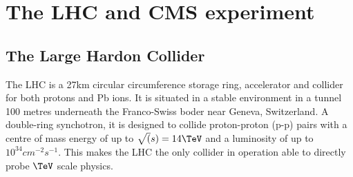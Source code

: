 
\chapter{The LHC and CMS experiment} %
\section{The Large Hardon Collider}
\label{lhc_intro}
The LHC is a 27km circular circumference storage ring, accelerator and collider for 
both protons and Pb ions. It is situated in a stable environment in a tunnel 
100 metres underneath the Franco-Swiss boder near Geneva, Switzerland.
A double-ring synchotron, it is designed to collide proton-proton (p-p)
pairs with a centre of mass energy of up to $\sqrt(s)=14\TeV$ and a 
luminosity of up to $10^{34}cm^{-2}s^{-1}$. This makes the LHC the only collider
in operation able to directly probe $\TeV$ scale physics. 

